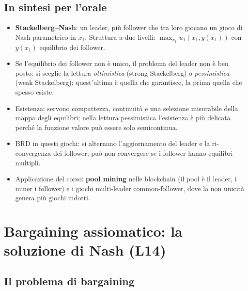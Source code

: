 \documentclass[12pt,a4paper,twoside]{book}
\theoremstyle{plain}
\theoremstyle{definition}
\begin{document}

\section*{In sintesi per l'orale}
\begin{itemize}
  \item \textbf{Stackelberg--Nash}: un leader, più follower che tra loro giocano un gioco di Nash parametrico in $x_1$. Struttura a due livelli: $\max_{x_1}u_1(x_1,y(x_1))$ con $y(x_1)$ equilibrio dei follower.
  \item Se l'equilibrio dei follower non è unico, il problema del leader non è ben posto: si sceglie la lettura \emph{ottimistica} (strong Stackelberg) o \emph{pessimistica} (weak Stackelberg); quest'ultima è quella che garantisce, la prima quella che spesso esiste.
  \item Esistenza: servono compattezza, continuità e una selezione misurabile della mappa degli equilibri; nella lettura pessimistica l'esistenza è più delicata perché la funzione valore può essere solo semicontinua.
  \item BRD in questi giochi: si alternano l'aggiornamento del leader e la ri-convergenza dei follower; può non convergere se i follower hanno equilibri multipli.
  \item Applicazione del corso: \textbf{pool mining} nelle blockchain (il pool è il leader, i miner i follower) e i giochi multi-leader common-follower, dove la non unicità genera più giochi indotti.
\end{itemize}


\chapter{Bargaining assiomatico: la soluzione di Nash (L14)}
\label{ch:bargaining-assiomatico}

\section{Il problema di bargaining}
\end{document}
